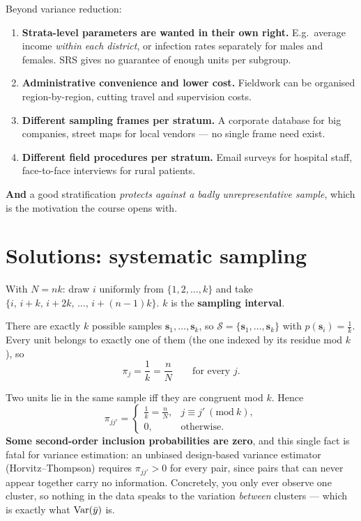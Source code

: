 \sol Beyond variance reduction:
\begin{enumerate}
  \item \textbf{Strata-level parameters are wanted in their own right.} E.g.\ average income
        \emph{within each district}, or infection rates separately for males and females. SRS
        gives no guarantee of enough units per subgroup.
  \item \textbf{Administrative convenience and lower cost.} Fieldwork can be organised
        region-by-region, cutting travel and supervision costs.
  \item \textbf{Different sampling frames per stratum.} A corporate database for big companies,
        street maps for local vendors --- no single frame need exist.
  \item \textbf{Different field procedures per stratum.} Email surveys for hospital staff,
        face-to-face interviews for rural patients.
\end{enumerate}
\textbf{And} a good stratification \emph{protects against a badly unrepresentative sample}, which
is the motivation the course opens with.

\section{Solutions: systematic sampling}
\setcounter{qq}{0}

 With $N=nk$: draw $i$ uniformly from $\{1,2,\dots,k\}$ and take
$\{i,\,i+k,\,i+2k,\,\dots,\,i+(n-1)k\}$. $k$ is the \textbf{sampling interval}.

 There are exactly $k$ possible samples $\bm s_1,\dots,\bm s_k$, so
$\mathcal S=\{\bm s_1,\dots,\bm s_k\}$ with $p(\bm s_i)=\frac1k$. Every unit belongs to exactly
one of them (the one indexed by its residue mod $k$), so
\[
  \pi_j=\frac1k=\frac nN \qquad\text{for every }j .
\]

 Two units lie in the same sample iff they are congruent mod $k$. Hence
\[
  \pi_{jj'}=\begin{cases}\frac1k=\frac nN,& j\equiv j'\ (\mathrm{mod}\ k),\\[2pt] 0,&\text{otherwise.}\end{cases}
\]
\textbf{Some second-order inclusion probabilities are zero}, and this single fact is fatal for
variance estimation: an unbiased design-based variance estimator (Horvitz--Thompson) requires
$\pi_{jj'}>0$ for every pair, since pairs that can never appear together carry no information.
Concretely, you only ever observe one cluster, so nothing in the data speaks to the variation
\emph{between} clusters --- which is exactly what $\operatorname{Var}(\bar{y})$ is.

